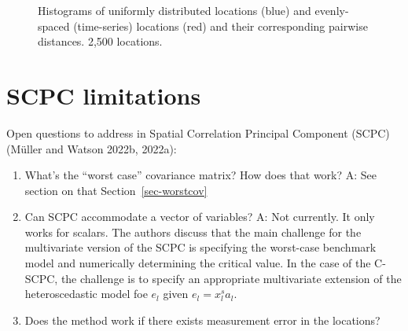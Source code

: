 \documentclass[
]{article}
\providecommand{\tightlist}{%
  \setlength{\itemsep}{0pt}\setlength{\parskip}{0pt}}\usepackage{longtable,booktabs,array}
\begin{document}
\begin{figure}

\begin{minipage}[t]{\linewidth}

{\centering 


}

\end{minipage}%
\newline
\begin{minipage}[t]{\linewidth}

{\centering 


}

\end{minipage}%

\caption{\label{fig-hist-loc-x10}Histograms of uniformly distributed
locations (blue) and evenly-spaced (time-series) locations (red) and
their corresponding pairwise distances. 2,500 locations.}

\end{figure}

\hypertarget{scpc-limitations}{%
\section{SCPC limitations}\label{scpc-limitations}}

Open questions to address in Spatial Correlation Principal Component
(SCPC) (Müller and Watson 2022b, 2022a):

\begin{enumerate}
\def\labelenumi{\arabic{enumi}.}
\tightlist
\item
  What's the ``worst case'' covariance matrix? How does that work? A:
  See section on that Section~\ref{sec-worstcov}
\item
  Can SCPC accommodate a vector of variables? A: Not currently. It only
  works for scalars. The authors discuss that the main challenge for the
  multivariate version of the SCPC is specifying the worst-case
  benchmark model and numerically determining the critical value. In the
  case of the C-SCPC, the challenge is to specify an appropriate
  multivariate extension of the heteroscedastic model foe \(e_l\) given
  \(e_l=x^s_la_l\).
\item
  Does the method work if there exists measurement error in the
  locations?
\end{enumerate}
\end{document}
